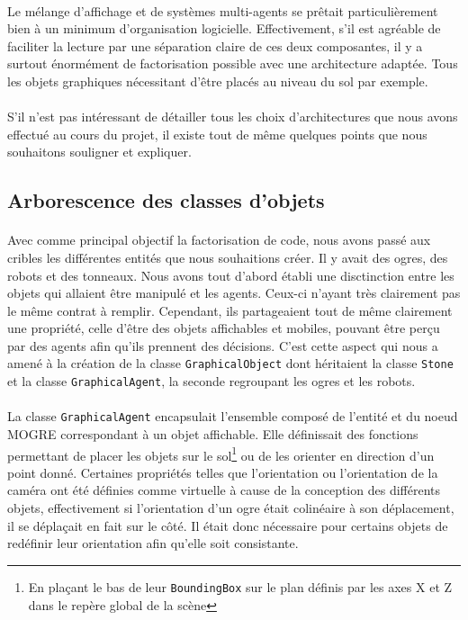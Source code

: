 \paragraph{}
Le mélange d'affichage et de systèmes multi-agents se prêtait particulièrement
bien à un minimum d'organisation logicielle. Effectivement, s'il est agréable
de faciliter la lecture par une séparation claire de ces deux composantes, il
y a surtout énormément de factorisation possible avec une architecture
adaptée. Tous les objets graphiques nécessitant d'être placés au niveau du sol
par exemple.

\paragraph{}
S'il n'est pas intéressant de détailler tous les choix d'architectures que
nous avons effectué au cours du projet, il existe tout de même quelques points
que nous souhaitons souligner et expliquer.

\subsection{Arborescence des classes d'objets}
\paragraph{}
Avec comme principal objectif la factorisation de code, nous avons passé aux
cribles les différentes entités que nous souhaitions créer. Il y avait des
ogres, des robots et des tonneaux. Nous avons tout d'abord établi une
disctinction entre les objets qui allaient être manipulé et les agents.
Ceux-ci n'ayant très clairement pas le même contrat à remplir. Cependant, ils
partageaient tout de même clairement une propriété, celle d'être des objets
affichables et mobiles, pouvant être perçu par des agents afin qu'ils prennent
des décisions. C'est cette aspect qui nous a amené à la création de la classe
\verb!GraphicalObject! dont héritaient la classe \verb!Stone! et la classe
\verb!GraphicalAgent!,  la seconde regroupant les ogres et les robots.

\paragraph{}
La classe \verb!GraphicalAgent! encapsulait l'ensemble composé de l'entité et
du noeud MOGRE
correspondant à un objet affichable. Elle définissait des fonctions permettant
de placer les objets sur le sol\footnote{En plaçant le bas de leur
\verb!BoundingBox! sur le plan définis par les axes X et Z dans le repère
global de la scène} ou de les orienter en direction d'un point donné.
Certaines propriétés telles que l'orientation ou l'orientation de la caméra
ont été définies comme virtuelle à cause de la conception des différents
objets, effectivement si l'orientation d'un ogre était colinéaire à son
déplacement, il se déplaçait en fait sur le côté. Il était donc nécessaire
pour certains objets de redéfinir leur orientation afin qu'elle soit
consistante.

